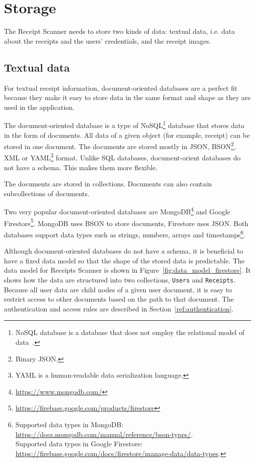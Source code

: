 \documentclass[
  digital, %
  table,   %
  oneside, %
  lof,     %
  lot,     %
]{fithesis3}
\newcommand{\definition}[1]{{#1}}
\begin{document}
\section{Storage}
\label{sec:storage}
The Receipt Scanner needs to store two kinds of data: textual data, i.e. data about the receipts and the users' credentials, and the receipt images.

\subsection{Textual data}
For textual receipt information, document-oriented databases are a perfect fit because they make it easy to store data in the same format and shape as they are used in the application. 

The document-oriented database is a type of NoSQL\footnote{NoSQL database is a database that does not employ the relational model of data~\cite{DigitalOcean2019Database}.} database that stores data in the form of documents. All data of a given object (for example, receipt) can be stored in one document. The documents are stored mostly in JSON, BSON\footnote{Binary JSON.}, XML or YAML\footnote{\definition{YAML} is a human-readable data serialization language.} format. Unlike SQL databases, document-orient databases do not have a schema. This makes them more flexible.

The documents are stored in collections. Documents can also contain subcollections of documents.

Two very popular document-oriented databases are MongoDB\footnote{\url{https://www.mongodb.com/}} and Google Firestore\footnote{\url{https://firebase.google.com/products/firestore}}. MongoDB uses BSON to store documents, Firestore uses JSON. Both databases support data types such as strings, numbers, arrays and timestamps\footnote{Supported data types in MongoDB: \url{https://docs.mongodb.com/manual/reference/bson-types/}.\\Supported data types in Google Firestore: \url{https://firebase.google.com/docs/firestore/manage-data/data-types}.}.

Although document-oriented databases do not have a schema, it is beneficial to have a fixed data model so that the shape of the stored data is predictable.
The data model for Receipts Scanner is shown in Figure~\ref{fig:data_model_firestore}. It shows how the data are structured into two collections, \texttt{Users} and \texttt{Receipts}. Because all user data are child nodes of a given user document, it is easy to restrict access to other documents based on the path to that document. The authentication and access rules are described in Section~\ref{ref:authentication}.
\end{document}
